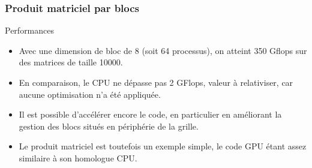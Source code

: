 \begin{frame}
    \frametitle{Produit matriciel par blocs}
\begin{block}{Performances}
 \begin{itemize}
    \item<+-> Avec une dimension de bloc de 8 (soit 64 processus), on atteint 350 Gflops sur des
    matrices de taille 10000.
    \item<+-> En comparaison, le CPU ne dépasse pas 2 GFlops, valeur à relativiser, car aucune optimisation n'a
    été appliquée.
    \item<+-> Il est possible d'accélérer encore le code, en particulier en améliorant la gestion des blocs
    situés en périphérie de la grille.
    \item<+-> Le produit matriciel est toutefois un exemple simple, le code GPU étant assez similaire à son 
    homologue CPU.
 \end{itemize} 
\end{block}
\end{frame}
